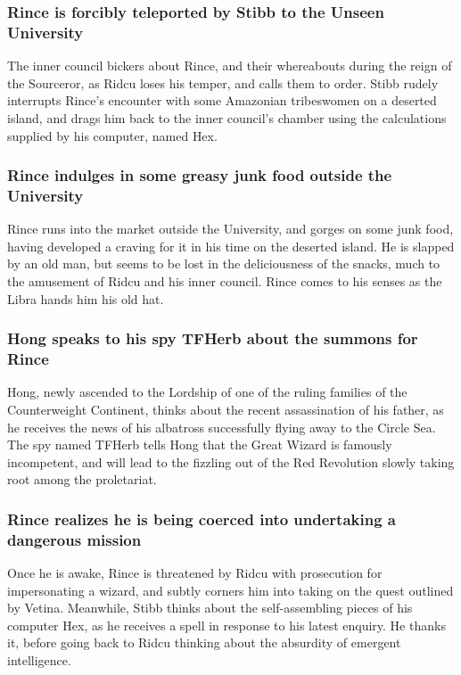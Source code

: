 \subsubsection{\Gls{Rince} is forcibly teleported by \Gls{Stibb} to the Unseen University}
The inner council bickers about \Gls{Rince}, and their whereabouts during the reign of the
Sourceror, as \Gls{Ridcu} loses his temper, and calls them to order. \Gls{Stibb} rudely interrupts
\Gls{Rince}'s encounter with some Amazonian tribeswomen on a deserted island, and drags him back
to the inner council's chamber using the calculations supplied by his computer, named \Gls{Hex}.

\subsubsection{\Gls{Rince} indulges in some greasy junk food outside the University}
\Gls{Rince} runs into the market outside the University, and gorges on some junk food, having
developed a craving for it in his time on the deserted island. He is slapped by an old man, but
seems to be lost in the deliciousness of the snacks, much to the amusement of \Gls{Ridcu} and his
inner council. \Gls{Rince} comes to his senses as the \Gls{Libra} hands him his old hat.

\subsubsection{\Gls{Hong} speaks to his spy \Gls{TFHerb} about the summons for \Gls{Rince}}
\Gls{Hong}, newly ascended to the Lordship of one of the ruling families of the Counterweight
Continent, thinks about the recent assassination of his father, as he receives the news of his
albatross successfully flying away to the Circle Sea. The spy named \Gls{TFHerb} tells \Gls{Hong}
that the Great Wizard is famously incompetent, and will lead to the fizzling out of the Red
Revolution slowly taking root among the proletariat.

\subsubsection{\Gls{Rince} realizes he is being coerced into undertaking a dangerous mission}
Once he is awake, \Gls{Rince} is threatened by \Gls{Ridcu} with prosecution for impersonating a
wizard, and subtly corners him into taking on the quest outlined by \Gls{Vetina}. Meanwhile,
\Gls{Stibb} thinks about the self-assembling pieces of his computer \Gls{Hex}, as he receives a
spell in response to his latest enquiry. He thanks it, before going back to \Gls{Ridcu} thinking
about the absurdity of emergent intelligence.

